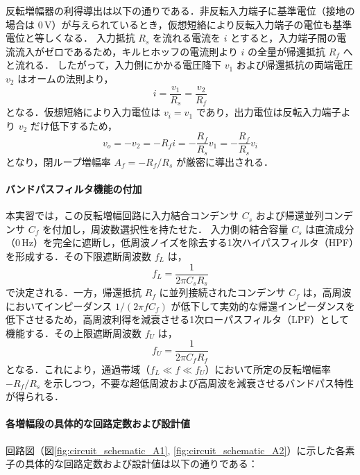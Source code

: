 反転増幅器の利得導出は以下の通りである．非反転入力端子に基準電位（接地の場合は 0\,V）が与えられているとき，仮想短絡により反転入力端子の電位も基準電位と等しくなる．
入力抵抗 $R_s$ を流れる電流を $i$ とすると，入力端子間の電流流入がゼロであるため，キルヒホッフの電流則より $i$ の全量が帰還抵抗 $R_f$ へと流れる．
したがって，入力側にかかる電圧降下 $v_1$ および帰還抵抗の両端電圧 $v_2$ はオームの法則より，
\begin{equation}
  i = \frac{v_1}{R_s} = \frac{v_2}{R_f}
  \label{eq:inverting_kcl}
\end{equation}
となる．仮想短絡により入力電位は $v_i = v_1$ であり，出力電位は反転入力端子より $v_2$ だけ低下するため，
\begin{equation}
  v_o = -v_2 = -R_f i = -\frac{R_f}{R_s} v_1 = -\frac{R_f}{R_s} v_i
  \label{eq:inverting_gain_proof}
\end{equation}
となり，閉ループ増幅率 $A_f = -R_f / R_s$ が厳密に導出される．

\paragraph{バンドパスフィルタ機能の付加}
本実習では，この反転増幅回路に入力結合コンデンサ $C_s$ および帰還並列コンデンサ $C_f$ を付加し，周波数選択性を持たせた．
入力側の結合容量 $C_s$ は直流成分（0\,Hz）を完全に遮断し，低周波ノイズを除去する1次ハイパスフィルタ（HPF）を形成する．その下限遮断周波数 $f_L$ は，
\begin{equation}
  f_L = \frac{1}{2\pi C_s R_s}
  \label{eq:fl_theory}
\end{equation}
で決定される．一方，帰還抵抗 $R_f$ に並列接続されたコンデンサ $C_f$ は，高周波においてインピーダンス $1/(2\pi f C_f)$ が低下して実効的な帰還インピーダンスを低下させるため，高周波利得を減衰させる1次ローパスフィルタ（LPF）として機能する．その上限遮断周波数 $f_U$ は，
\begin{equation}
  f_U = \frac{1}{2\pi C_f R_f}
  \label{eq:fu_theory}
\end{equation}
となる．これにより，通過帯域（$f_L \ll f \ll f_U$）において所定の反転増幅率 $-R_f / R_s$ を示しつつ，不要な超低周波および高周波を減衰させるバンドパス特性が得られる．

\paragraph{各増幅段の具体的な回路定数および設計値}
回路図（図\ref{fig:circuit_schematic_A1}, \ref{fig:circuit_schematic_A2}）に示した各素子の具体的な回路定数および設計値は以下の通りである：

